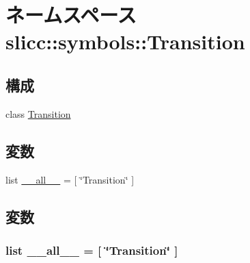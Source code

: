 \hypertarget{namespaceslicc_1_1symbols_1_1Transition}{
\section{ネームスペース slicc::symbols::Transition}
\label{namespaceslicc_1_1symbols_1_1Transition}
}
\subsection*{構成}
\begin{DoxyCompactItemize}
\item 
class \hyperlink{classslicc_1_1symbols_1_1Transition_1_1Transition}{Transition}
\end{DoxyCompactItemize}
\subsection*{変数}
\begin{DoxyCompactItemize}
\item 
list \hyperlink{namespaceslicc_1_1symbols_1_1Transition_aa4a022e6ddacd362b83964da5cc5d044}{\_\-\_\-all\_\-\_\-} = \mbox{[} \char`\"{}Transition\char`\"{} \mbox{]}
\end{DoxyCompactItemize}


\subsection{変数}
\hypertarget{namespaceslicc_1_1symbols_1_1Transition_aa4a022e6ddacd362b83964da5cc5d044}{
\subsubsection[{\_\-\_\-all\_\-\_\-}]{\setlength{\rightskip}{0pt plus 5cm}list {\bf \_\-\_\-all\_\-\_\-} = \mbox{[} \char`\"{}Transition\char`\"{} \mbox{]}}}
\label{namespaceslicc_1_1symbols_1_1Transition_aa4a022e6ddacd362b83964da5cc5d044}
